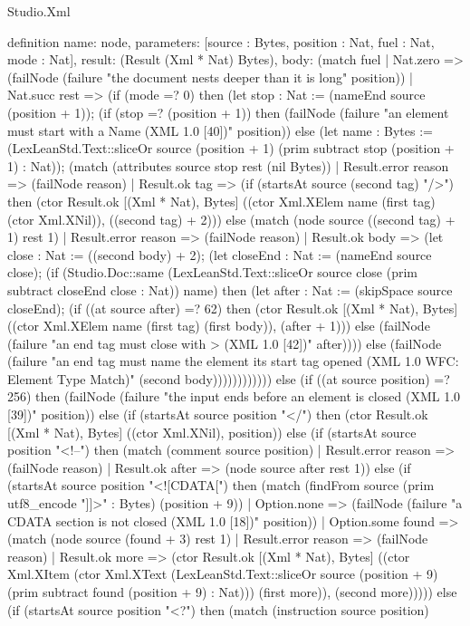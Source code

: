 \begin{lexlean}{Studio.Xml}
\begin{semanticmodule}
definition{
  name: node,
  parameters: [source : Bytes, position : Nat, fuel : Nat, mode : Nat],
  result: (Result (Xml * Nat) Bytes),
  body: (match fuel
    | Nat.zero => (failNode (failure "the document nests deeper than it is long" position))
    | Nat.succ rest => (if (mode =? 0) then (let stop : Nat := (nameEnd source (position + 1)); (if (stop =? (position + 1)) then (failNode (failure "an element must start with a Name (XML 1.0 [40])" position)) else (let name : Bytes := (LexLeanStd.Text::sliceOr source (position + 1) (prim subtract stop (position + 1) : Nat)); (match (attributes source stop rest (nil Bytes))
      | Result.error reason => (failNode reason)
      | Result.ok tag => (if (startsAt source (second tag) "/>") then (ctor Result.ok [(Xml * Nat), Bytes] ((ctor Xml.XElem name (first tag) (ctor Xml.XNil)), ((second tag) + 2))) else (match (node source ((second tag) + 1) rest 1)
        | Result.error reason => (failNode reason)
        | Result.ok body => (let close : Nat := ((second body) + 2); (let closeEnd : Nat := (nameEnd source close); (if (Studio.Doc::same (LexLeanStd.Text::sliceOr source close (prim subtract closeEnd close : Nat)) name) then (let after : Nat := (skipSpace source closeEnd); (if ((at source after) =? 62) then (ctor Result.ok [(Xml * Nat), Bytes] ((ctor Xml.XElem name (first tag) (first body)), (after + 1))) else (failNode (failure "an end tag must close with > (XML 1.0 [42])" after)))) else (failNode (failure "an end tag must name the element its start tag opened (XML 1.0 WFC: Element Type Match)" (second body)))))))))))) else (if ((at source position) =? 256) then (failNode (failure "the input ends before an element is closed (XML 1.0 [39])" position)) else (if (startsAt source position "</") then (ctor Result.ok [(Xml * Nat), Bytes] ((ctor Xml.XNil), position)) else (if (startsAt source position "<!--") then (match (comment source position)
      | Result.error reason => (failNode reason)
      | Result.ok after => (node source after rest 1)) else (if (startsAt source position "<![CDATA[") then (match (findFrom source (prim utf8_encode "]]>" : Bytes) (position + 9))
      | Option.none => (failNode (failure "a CDATA section is not closed (XML 1.0 [18])" position))
      | Option.some found => (match (node source (found + 3) rest 1)
      | Result.error reason => (failNode reason)
      | Result.ok more => (ctor Result.ok [(Xml * Nat), Bytes] ((ctor Xml.XItem (ctor Xml.XText (LexLeanStd.Text::sliceOr source (position + 9) (prim subtract found (position + 9) : Nat))) (first more)), (second more))))) else (if (startsAt source position "<?") then (match (instruction source position)
}
\end{semanticmodule}
\end{lexlean}
